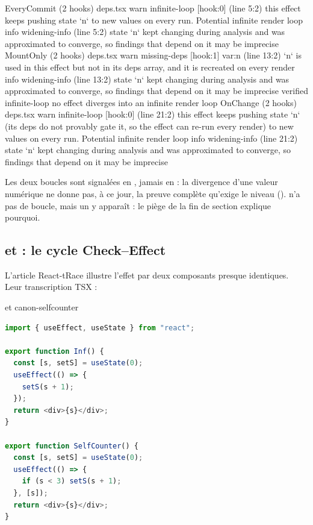 \begin{sortie}
  EveryCommit  (2 hooks)  deps.tsx
    warn   infinite-loop  [hook:0]  (line 5:2)  this effect keeps pushing state `n` to new values on every run. Potential infinite render loop
    info   widening-info  (line 5:2)  state `n` kept changing during analysis and was approximated to converge, so findings that depend on it may be imprecise
  MountOnly  (2 hooks)  deps.tsx
    warn   missing-deps  [hook:1]  var:n  (line 13:2)  `n` is used in this effect but not in its deps array, and it is recreated on every render
    info   widening-info  (line 13:2)  state `n` kept changing during analysis and was approximated to converge, so findings that depend on it may be imprecise
    verified  infinite-loop  no effect diverges into an infinite render loop
  OnChange  (2 hooks)  deps.tsx
    warn   infinite-loop  [hook:0]  (line 21:2)  this effect keeps pushing state `n` (its deps do not provably gate it, so the effect can re-run every render) to new values on every run. Potential infinite render loop
    info   widening-info  (line 21:2)  state `n` kept changing during analysis and was approximated to converge, so findings that depend on it may be imprecise
\end{sortie}

Les deux boucles sont signalées en \Warning{}, jamais en \Error{} : la
divergence d'une valeur numérique ne donne pas, à ce jour, la preuve complète
qu'exige le niveau \Error{} ().  n'a pas de boucle,
mais un \Info{}  y apparaît : le piège de la fin de section
explique pourquoi.

\subsection{ et  : le cycle Check--Effect}

L'article React-tRace \cite{LeeAhnYi2025} illustre l'effet par deux composants
presque identiques. Leur transcription TSX :

\begin{exemple}{ et }{canon-selfcounter}
\begin{lstlisting}[language=TypeScript,caption={\code{Inf} et \code{SelfCounter} (\file{/tmp/ch02/selfcounter.tsx})},label={lst:react-modele-selfcounter}]
import { useEffect, useState } from "react";

export function Inf() {
  const [s, setS] = useState(0);
  useEffect(() => {
    setS(s + 1);
  });
  return <div>{s}</div>;
}

export function SelfCounter() {
  const [s, setS] = useState(0);
  useEffect(() => {
    if (s < 3) setS(s + 1);
  }, [s]);
  return <div>{s}</div>;
}
\end{lstlisting}
\end{exemple}

